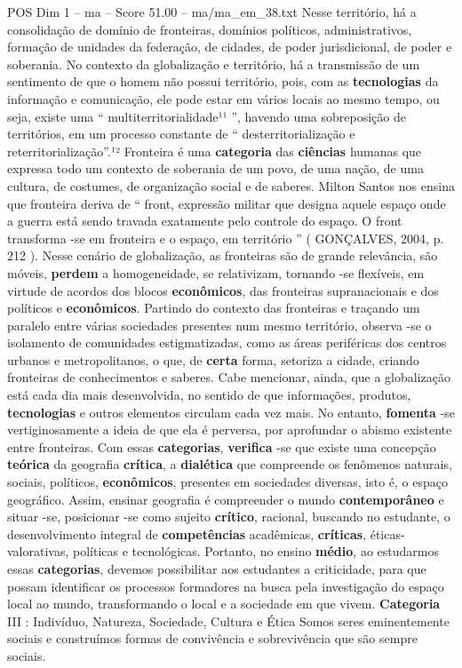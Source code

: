 \begin{textsample}{POS Dim 1 – ma – Score 51.00 – ma/ma\_em\_38.txt}
Nesse território, há a consolidação de domínio de fronteiras, domínios políticos, administrativos, formação de unidades da federação, de cidades, de poder jurisdicional, de poder e soberania.
No contexto da globalização e território, há a transmissão de um sentimento de que o homem não possui território, pois, com as \textbf{tecnologias} da informação e comunicação, ele pode estar em vários locais ao mesmo tempo, ou seja, existe uma “ multiterritorialidade¹¹ ”, havendo uma sobreposição de territórios, em um processo constante de “ desterritorialização e reterritorialização”.¹² Fronteira é uma \textbf{categoria} das \textbf{ciências} humanas que expressa todo um contexto de soberania de um povo, de uma nação, de uma cultura, de costumes, de organização social e de saberes.
Milton Santos nos ensina que fronteira deriva de “ front, expressão militar que designa aquele espaço onde a guerra está sendo travada exatamente pelo controle do espaço.
O front transforma -se em fronteira e o espaço, em território ” ( GONÇALVES, 2004, p. 212 ).
Nesse cenário de globalização, as fronteiras são de grande relevância, são móveis, \textbf{perdem} a homogeneidade, se relativizam, tornando -se flexíveis, em virtude de acordos dos blocos \textbf{econômicos}, das fronteiras supranacionais e dos políticos e \textbf{econômicos}.
Partindo do contexto das fronteiras e traçando um paralelo entre várias sociedades presentes num mesmo território, observa -se o isolamento de comunidades estigmatizadas, como as áreas periféricas dos centros urbanos e metropolitanos, o que, de \textbf{certa} forma, setoriza a cidade, criando fronteiras de conhecimentos e saberes.
Cabe mencionar, ainda, que a globalização está cada dia mais desenvolvida, no sentido de que informações, produtos, \textbf{tecnologias} e outros elementos circulam cada vez mais.
No entanto, \textbf{fomenta} -se vertiginosamente a ideia de que ela é perversa, por aprofundar o abismo existente entre fronteiras.
Com essas \textbf{categorias}, \textbf{verifica} -se que existe uma concepção \textbf{teórica} da geografia \textbf{crítica}, a \textbf{dialética} que compreende os fenômenos naturais, sociais, políticos, \textbf{econômicos}, presentes em sociedades diversas, isto é, o espaço geográfico.
Assim, ensinar geografia é compreender o mundo \textbf{contemporâneo} e situar -se, posicionar -se como sujeito \textbf{crítico}, racional, buscando no estudante, o desenvolvimento integral de \textbf{competências} acadêmicas, \textbf{críticas}, éticas-valorativas, políticas e tecnológicas.
Portanto, no ensino \textbf{médio}, ao estudarmos essas \textbf{categorias}, devemos possibilitar aos estudantes a criticidade, para que possam identificar os processos formadores na busca pela investigação do espaço local ao mundo, transformando o local e a sociedade em que vivem. \textbf{Categoria} III : Indivíduo, Natureza, Sociedade, Cultura e Ética Somos seres eminentemente sociais e construímos formas de convivência e sobrevivência que são sempre sociais.

\end{textsample}
